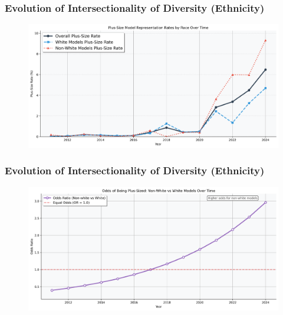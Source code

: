 \documentclass[aspectratio=169,xcolor=dvipsnames,10pt]{beamer}
\begin{document}
\begin{frame}[t]
    \frametitle{Evolution of Intersectionality of Diversity (Ethnicity)}
    \begin{figure}
            \begin{center}
            \includegraphics[width=\textwidth]{figures/plus_size_rates_by_race.png}
            \end{center}
        \end{figure}
\end{frame}

\begin{frame}[t]
    \frametitle{Evolution of Intersectionality of Diversity (Ethnicity)}
    \begin{figure}
            \begin{center}
            \includegraphics[width=\textwidth]{figures/race_odds_ratio_trends_odds_ratio.png}
            \end{center}
        \end{figure}
\end{frame}
\end{document}

